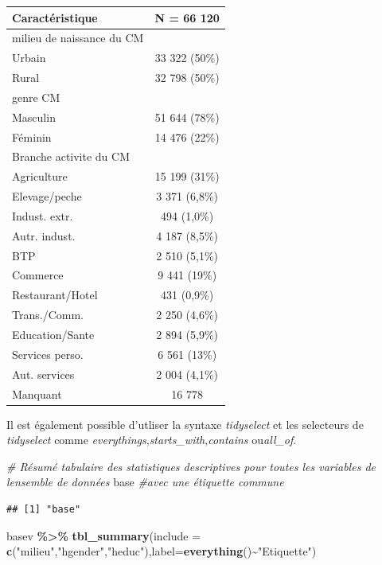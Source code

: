 \documentclass[
]{article}
\newenvironment{Shaded}{\begin{snugshade}}{\end{snugshade}}
\newcommand{\AttributeTok}[1]{\textcolor[rgb]{0.13,0.29,0.53}{#1}}
\newcommand{\CommentTok}[1]{\textcolor[rgb]{0.56,0.35,0.01}{\textit{#1}}}
\newcommand{\FunctionTok}[1]{\textcolor[rgb]{0.13,0.29,0.53}{\textbf{#1}}}
\newcommand{\NormalTok}[1]{#1}
\newcommand{\SpecialCharTok}[1]{\textcolor[rgb]{0.81,0.36,0.00}{\textbf{#1}}}
\newcommand{\StringTok}[1]{\textcolor[rgb]{0.31,0.60,0.02}{#1}}
\begin{document}
\begin{longtable}[]{@{}lc@{}}
\toprule\noalign{}
\textbf{Caractéristique} & \textbf{N = 66 120} \\
\midrule\noalign{}
\endhead
\bottomrule\noalign{}
\endlastfoot
milieu de naissance du CM & \\
Urbain & 33 322 (50\%) \\
Rural & 32 798 (50\%) \\
genre CM & \\
Masculin & 51 644 (78\%) \\
Féminin & 14 476 (22\%) \\
Branche activite du CM & \\
Agriculture & 15 199 (31\%) \\
Elevage/peche & 3 371 (6,8\%) \\
Indust. extr. & 494 (1,0\%) \\
Autr. indust. & 4 187 (8,5\%) \\
BTP & 2 510 (5,1\%) \\
Commerce & 9 441 (19\%) \\
Restaurant/Hotel & 431 (0,9\%) \\
Trans./Comm. & 2 250 (4,6\%) \\
Education/Sante & 2 894 (5,9\%) \\
Services perso. & 6 561 (13\%) \\
Aut. services & 2 004 (4,1\%) \\
Manquant & 16 778 \\
\end{longtable}

Il est également possible d'utliser la syntaxe \emph{tidyselect} et les
selecteurs de \emph{tidyselect} comme
\emph{everythings},\emph{starts\_with},\emph{contains} ou\emph{all\_of}.

\begin{Shaded}
\begin{Highlighting}[]
\CommentTok{\# Résumé tabulaire des statistiques descriptives pour toutes les variables de l\textquotesingle{}ensemble de données }
\StringTok{\textquotesingle{}base\textquotesingle{}} \CommentTok{\#avec une étiquette commune}
\end{Highlighting}
\end{Shaded}

\begin{verbatim}
## [1] "base"
\end{verbatim}

\begin{Shaded}
\begin{Highlighting}[]
\NormalTok{basev }\SpecialCharTok{\%\textgreater{}\%}
  \FunctionTok{tbl\_summary}\NormalTok{(}\AttributeTok{include =} \FunctionTok{c}\NormalTok{(}\StringTok{"milieu"}\NormalTok{,}\StringTok{"hgender"}\NormalTok{,}\StringTok{"heduc"}\NormalTok{),}\AttributeTok{label=}\FunctionTok{everything}\NormalTok{()}\SpecialCharTok{\textasciitilde{}}\StringTok{"Etiquette"}\NormalTok{)}
\end{Highlighting}
\end{Shaded}
\end{document}
